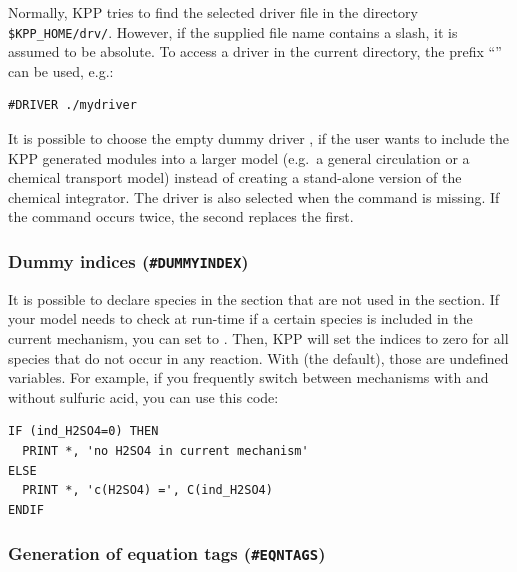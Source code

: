 \documentclass[twoside]{article}
\begin{document}
Normally, KPP tries to find the selected driver file in the directory
\verb|$KPP_HOME/drv/|.
However, if the supplied file name contains a slash, it is assumed to be
absolute. To access a driver in the current directory, the prefix
``'' can be used, e.g.:
%
\begin{verbatim}
#DRIVER ./mydriver
\end{verbatim}
%
It is possible to choose the empty dummy driver , if the user
wants to include the KPP generated modules into a larger model (e.g.\ a
general circulation or a chemical transport model) instead of creating a
stand-alone version of the chemical integrator. The driver 
is also selected when the  command is missing. If the
 command occurs twice, the second replaces the first.

\subsubsection{Dummy indices ({\tt\#DUMMYINDEX})}
\label{sec:command-dummyindex}

It is possible to declare species in the  section that
are not used in the  section. If your model needs to
check at run-time if a certain species is included in the current
mechanism, you can set  to . Then, KPP will
set the indices  to zero for all species that do not
occur in any reaction. With   (the default),
those  are undefined variables. For example, if you
frequently switch between mechanisms with and without sulfuric acid, you
can use this code:
%
\begin{verbatim}
IF (ind_H2SO4=0) THEN
  PRINT *, 'no H2SO4 in current mechanism'
ELSE
  PRINT *, 'c(H2SO4) =', C(ind_H2SO4)
ENDIF
\end{verbatim}

\subsubsection{Generation of equation tags ({\tt\#EQNTAGS})}
\label{sec:command-eqntags}
\end{document}
